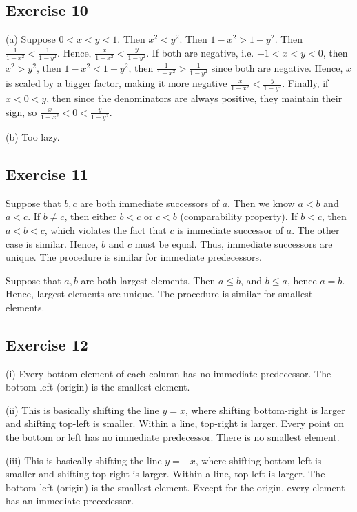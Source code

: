 \documentclass{book}
\begin{document}
\subsection*{Exercise 10}
(a)
Suppose $0 < x < y < 1$. Then $x^2 < y^2$. Then $1 - x^2 > 1 - y^2$. Then $\frac{1}{1 - x^2} < \frac{1}{1 - y^2}$. Hence, $\frac{x}{1 - x^2} < \frac{y}{1 - y^2}$. If both are negative, i.e. $-1 < x < y < 0$, then $x^2 > y^2$, then $1 - x^2 < 1 - y^2$, then $\frac{1}{1 - x^2} > \frac{1}{1 - y^2}$ since both are negative. Hence, $x$ is scaled by a bigger factor, making it more negative $\frac{x}{1 - x^2} < \frac{y}{1 - y^2}$. Finally, if $x < 0 < y$, then since the denominators are always positive, they maintain their sign, so $\frac{x}{1 - x^2} < 0 < \frac{y}{1 - y^2}$.

\noindent
(b)
Too lazy.

\subsection*{Exercise 11}
Suppose that $b, c$ are both immediate successors of $a$. Then we know $a < b$ and $a < c$. If $b \neq c$, then either $b < c$ or $c < b$ (comparability property). If $b < c$, then $a < b < c$, which violates the fact that $c$ is immediate successor of $a$. The other case is similar. Hence, $b$ and $c$ must be equal. Thus, immediate successors are unique. The procedure is similar for immediate predecessors.

Suppose that $a, b$ are both largest elements. Then $a \leq b$, and $b \leq a$, hence $a = b$. Hence, largest elements are unique. The procedure is similar for smallest elements.

\subsection*{Exercise 12}
(i) Every bottom element of each column has no immediate predecessor. The bottom-left (origin) is the smallest element.

\noindent
(ii) This is basically shifting the line $y = x$, where shifting bottom-right is larger and shifting top-left is smaller. Within a line, top-right is larger. Every point on the bottom or left has no immediate predecessor. There is no smallest element.

\noindent
(iii) This is basically shifting the line $y = -x$, where shifting bottom-left is smaller and shifting top-right is larger. Within a line, top-left is larger. The bottom-left (origin) is the smallest element. Except for the origin, every element has an immediate precedessor.
\end{document}
